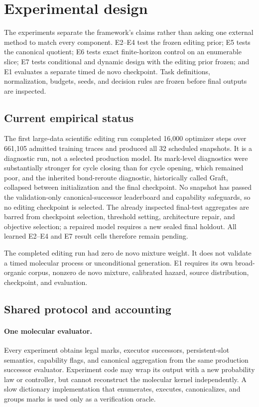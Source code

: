 \section{Experimental design}
\label{sec:experiments}

The experiments separate the framework's claims rather than asking one external
method to match every component. E2--E4 test the frozen editing prior; E5 tests
the canonical quotient; E6 tests exact finite-horizon control on an enumerable
slice; E7 tests conditional and dynamic design with the editing prior frozen;
and E1 evaluates a separate timed de novo checkpoint. Task definitions,
normalization, budgets, seeds, and decision rules are frozen before final
outputs are inspected.

\subsection{Current empirical status}

The first large-data scientific editing run completed 16,000 optimizer steps
over 661,105 admitted training traces and produced all 32 scheduled snapshots.
It is a diagnostic run, not a selected production model. Its mark-level
diagnostics were substantially stronger for cycle closing than for cycle
opening, which remained poor, and the inherited bond-reroute diagnostic,
historically called Graft, collapsed between initialization and the final
checkpoint. No
snapshot has passed the validation-only canonical-successor leaderboard and
capability safeguards, so no editing checkpoint is selected. The already
inspected final-test aggregates are barred from checkpoint selection,
threshold setting, architecture repair, and objective selection; a repaired
model requires a new sealed final holdout. All learned E2--E4 and E7 result
cells therefore remain pending.

The completed editing run had zero de novo mixture weight. It does not validate
a timed molecular process or unconditional generation. E1 requires its own
broad-organic corpus, nonzero de novo mixture, calibrated hazard, source
distribution, checkpoint, and evaluation.

\subsection{Shared protocol and accounting}

\paragraph{One molecular evaluator.}
Every experiment obtains legal marks, executor successors, persistent-slot
semantics, capability flags, and canonical aggregation from the same production
successor evaluator. Experiment code may wrap its output with a new probability
law or controller, but cannot reconstruct the molecular kernel independently.
A slow dictionary implementation that enumerates, executes, canonicalizes, and
groups marks is used only as a verification oracle.

